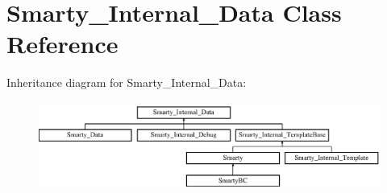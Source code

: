 \hypertarget{class_smarty___internal___data}{}\section{Smarty\+\_\+\+Internal\+\_\+\+Data Class Reference}
\label{class_smarty___internal___data}
Inheritance diagram for Smarty\+\_\+\+Internal\+\_\+\+Data\+:\begin{figure}[H]
\begin{center}
\leavevmode
\includegraphics[height=2.901555cm]{class_smarty___internal___data}
\end{center}
\end{figure}
